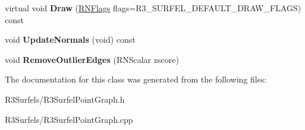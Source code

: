\begin{DoxyCompactItemize}
\item 
virtual void {\bfseries Draw} (\hyperlink{class_r_n_flags}{R\+N\+Flags} flags=R3\+\_\+\+S\+U\+R\+F\+E\+L\+\_\+\+D\+E\+F\+A\+U\+L\+T\+\_\+\+D\+R\+A\+W\+\_\+\+F\+L\+A\+GS) const \hypertarget{class_r3_surfel_point_graph_a81ed66885f630f46034dd3a7bcf2e1dd}{}\label{class_r3_surfel_point_graph_a81ed66885f630f46034dd3a7bcf2e1dd}

\item 
void {\bfseries Update\+Normals} (void) const \hypertarget{class_r3_surfel_point_graph_ab0ce15371513da48de1da0a8e97ccc09}{}\label{class_r3_surfel_point_graph_ab0ce15371513da48de1da0a8e97ccc09}

\item 
void {\bfseries Remove\+Outlier\+Edges} (R\+N\+Scalar zscore)\hypertarget{class_r3_surfel_point_graph_ac95a66a3c71ce0e61d234d29a1d3ebdb}{}\label{class_r3_surfel_point_graph_ac95a66a3c71ce0e61d234d29a1d3ebdb}

\end{DoxyCompactItemize}


The documentation for this class was generated from the following files\+:\begin{DoxyCompactItemize}
\item 
R3\+Surfels/R3\+Surfel\+Point\+Graph.\+h\item 
R3\+Surfels/R3\+Surfel\+Point\+Graph.\+cpp\end{DoxyCompactItemize}

